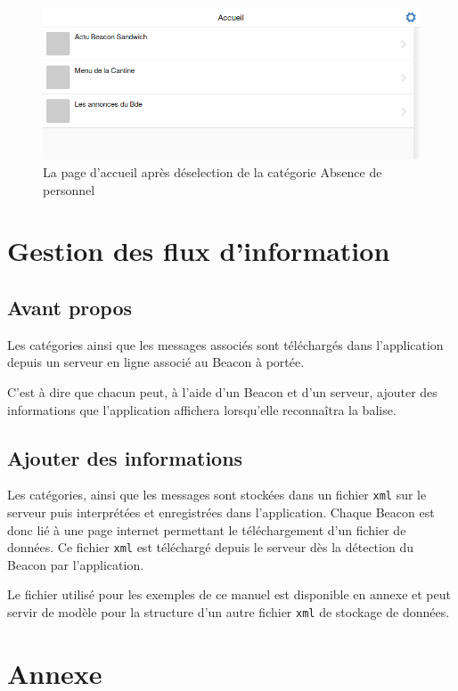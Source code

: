 \documentclass{report}
\begin{document}
\begin{figure}[h]
	\centering
	\includegraphics[scale=0.28]{accueilPerso.png}
	\caption{La page d'accueil après déselection de la catégorie \og Absence de personnel \fg}
\end{figure}

\chapter{Gestion des flux d'information}

\section{Avant propos}

Les catégories ainsi que les messages associés sont téléchargés dans l'application depuis un serveur en ligne associé au Beacon à portée. 

C'est à dire que chacun peut, à l'aide d'un Beacon et d'un serveur, ajouter des informations que l'application affichera lorsqu'elle reconnaîtra la balise.

\section{Ajouter des informations}

Les catégories, ainsi que les messages sont stockées dans un fichier \texttt{xml} sur le serveur puis interprétées et enregistrées dans l'application. Chaque Beacon est donc lié à une page internet permettant le téléchargement d'un fichier de données.
Ce fichier \texttt{xml} est téléchargé depuis le serveur dès la détection du Beacon par l'application.

Le fichier utilisé pour les exemples de ce manuel est disponible en annexe et peut servir de modèle pour la structure d'un autre fichier \texttt{xml} de stockage de données.


\chapter{Annexe}
\end{document}
